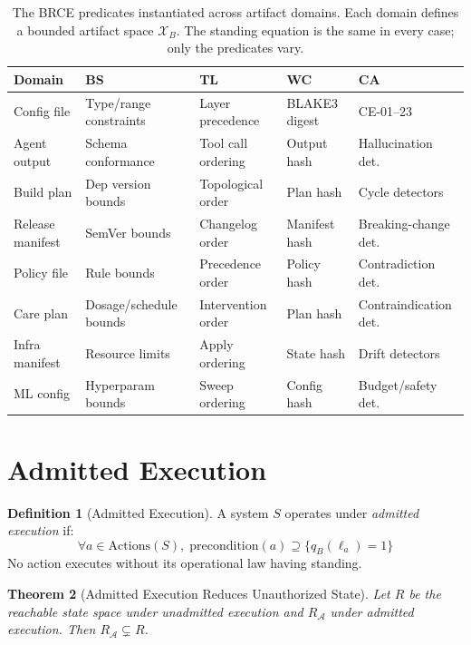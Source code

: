 \documentclass[12pt, letterpaper]{report}
\theoremstyle{plain}
\newtheorem{theorem}{Theorem}[chapter]
\theoremstyle{definition}
\newtheorem{definition}[theorem]{Definition}
\theoremstyle{remark}
\begin{document}
\begin{table}[h]
\centering
\renewcommand{\arraystretch}{1.35}
\begin{tabular}{@{}lp{2.6cm}p{2.6cm}p{2.2cm}p{3.0cm}@{}}
\toprule
\textbf{Domain} & \textbf{BS} & \textbf{TL} & \textbf{WC} & \textbf{CA} \\
\midrule
Config file & Type/range constraints & Layer precedence & BLAKE3 digest & CE-01--23 \\
Agent output & Schema conformance & Tool call ordering & Output hash & Hallucination det. \\
Build plan & Dep version bounds & Topological order & Plan hash & Cycle detectors \\
Release manifest & SemVer bounds & Changelog order & Manifest hash & Breaking-change det. \\
Policy file & Rule bounds & Precedence order & Policy hash & Contradiction det. \\
Care plan & Dosage/schedule bounds & Intervention order & Plan hash & Contraindication det. \\
Infra manifest & Resource limits & Apply ordering & State hash & Drift detectors \\
ML config & Hyperparam bounds & Sweep ordering & Config hash & Budget/safety det. \\
\bottomrule
\end{tabular}
\caption{The BRCE predicates instantiated across artifact domains.
Each domain defines a bounded artifact space $\mathcal{X}_B$.
The standing equation is the same in every case; only the predicates vary.}
\label{tab:general}
\end{table}

\section{Admitted Execution}

\begin{definition}[Admitted Execution]
A system $S$ operates under \emph{admitted execution} if:
\[
  \forall a \in \mathrm{Actions}(S),\;
  \mathrm{precondition}(a) \supseteq \bigl\{ q_B(\ell_a) = 1 \bigr\}
\]
No action executes without its operational law having standing.
\end{definition}

\begin{theorem}[Admitted Execution Reduces Unauthorized State]
Let $R$ be the reachable state space under unadmitted execution
and $R_\mathcal{A}$ under admitted execution.
Then $R_\mathcal{A} \subsetneq R$.
\end{theorem}
\end{document}
